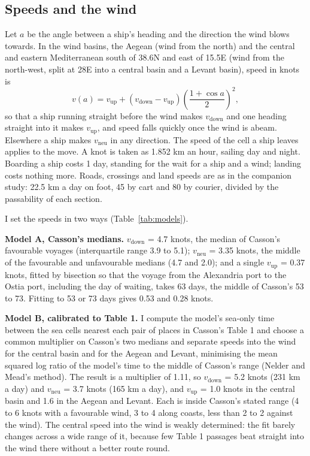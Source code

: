 \documentclass[11pt,a4paper]{article}
\begin{document}
\subsection{Speeds and the wind}
Let $a$ be the angle between a ship's heading and the direction the wind blows towards. In the wind basins, the Aegean (wind from the north) and the central and eastern Mediterranean south of 38.6\textdegree{}N and east of 15.5\textdegree{}E (wind from the north-west, split at 28\textdegree{}E into a central basin and a Levant basin), speed in knots is
\[ v(a) = v_\text{up} + (v_\text{down} - v_\text{up}) \left(\frac{1 + \cos a}{2}\right)^{2}, \]
so that a ship running straight before the wind makes $v_\text{down}$ and one heading straight into it makes $v_\text{up}$, and speed falls quickly once the wind is abeam. Elsewhere a ship makes $v_\text{neu}$ in any direction. The speed of the cell a ship leaves applies to the move. A knot is taken as 1.852 km an hour, sailing day and night. Boarding a ship costs 1 day, standing for the wait for a ship and a wind; landing costs nothing more. Roads, crossings and land speeds are as in the companion study: 22.5 km a day on foot, 45 by cart and 80 by courier, divided by the passability of each section.

I set the speeds in two ways (Table~\ref{tab:models}).

\textbf{Model A, Casson's medians.} $v_\text{down}$ = 4.7 knots, the median of Casson's favourable voyages (interquartile range 3.9 to 5.1); $v_\text{neu}$ = 3.35 knots, the middle of the favourable and unfavourable medians (4.7 and 2.0); and a single $v_\text{up}$ = 0.37 knots, fitted by bisection so that the voyage from the Alexandria port to the Ostia port, including the day of waiting, takes 63 days, the middle of Casson's 53 to 73. Fitting to 53 or 73 days gives 0.53 and 0.28 knots.

\textbf{Model B, calibrated to Table 1.} I compute the model's sea-only time between the sea cells nearest each pair of places in Casson's Table 1 and choose a common multiplier on Casson's two medians and separate speeds into the wind for the central basin and for the Aegean and Levant, minimising the mean squared log ratio of the model's time to the middle of Casson's range (Nelder and Mead's method). The result is a multiplier of 1.11, so $v_\text{down}$ = 5.2 knots (231 km a day) and $v_\text{neu}$ = 3.7 knots (165 km a day), and $v_\text{up}$ = 1.0 knots in the central basin and 1.6 in the Aegean and Levant. Each is inside Casson's stated range (4 to 6 knots with a favourable wind, 3 to 4 along coasts, less than 2 to 2\textonehalf{} against the wind). The central speed into the wind is weakly determined: the fit barely changes across a wide range of it, because few Table 1 passages beat straight into the wind there without a better route round.
\end{document}
